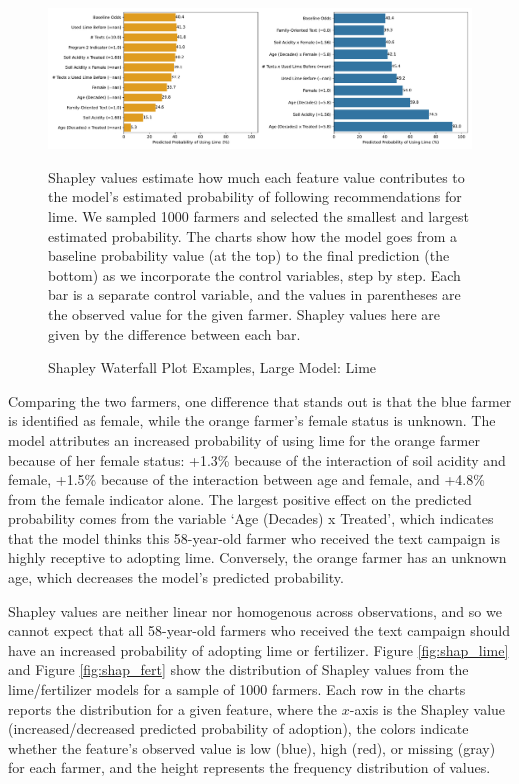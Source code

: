 \documentclass[12pt]{article}
\begin{document}
\begin{figure}[H]
    \centering
    \caption{Shapley Waterfall Plot Examples, Large Model: Lime}
    \includegraphics[width=\textwidth]{../output/shap_forceplot_examples_lime.pdf}
    \begin{minipage}{0.8\textwidth}
    \tiny
    Shapley values estimate how much each feature value contributes to the model's estimated probability of following recommendations for lime. We sampled 1000 farmers and selected the smallest and largest estimated probability. The charts show how the model goes from a baseline probability value (at the top) to the final prediction (the bottom) as we incorporate the control variables, step by step. Each bar is a separate control variable, and the values in parentheses are the observed value for the given farmer. Shapley values here are given by the difference between each bar.
    \end{minipage}
    \label{fig:shap_force}
\end{figure}

Comparing the two farmers, one difference that stands out is that the blue farmer is identified as female, while the orange farmer's female status is unknown. The model attributes an increased probability of using lime for the orange farmer because of her female status: +1.3\% because of the interaction of soil acidity and female, +1.5\% because of the interaction between age and female, and +4.8\% from the female indicator alone. The largest positive effect on the predicted probability comes from the variable `Age (Decades) x Treated', which indicates that the model thinks this 58-year-old farmer who received the text campaign is highly receptive to adopting lime. Conversely, the orange farmer has an unknown age, which decreases the model's predicted probability.

Shapley values are neither linear nor homogenous across observations, and so we cannot expect that all 58-year-old farmers who received the text campaign should have an increased probability of adopting lime or fertilizer. Figure \ref{fig:shap_lime} and Figure \ref{fig:shap_fert} show the distribution of Shapley values from the lime/fertilizer models for a sample of 1000 farmers. Each row in the charts reports the distribution for a given feature, where the $x$-axis is the Shapley value (increased/decreased predicted probability of adoption), the colors indicate whether the feature's observed value is low (blue), high (red), or missing (gray) for each farmer, and the height represents the frequency distribution of values.
\end{document}
